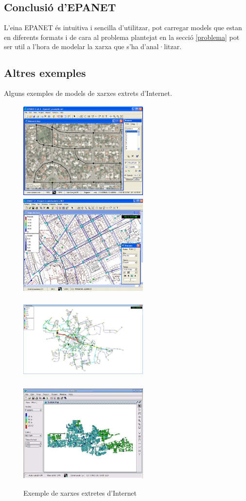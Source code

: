 \documentclass[12pt]{article}
\begin{document}
\clearpage
\subsection{Conclusió d'EPANET}
L'eina EPANET és intuitiva i sencilla d'utilitzar, pot carregar models que estan en diferents formats i de cara al problema plantejat en la secció \ref{problema} pot ser util a l'hora de modelar la xarxa que s'ha d'anal·litzar.

\subsection{Altres exemples}
Alguns exemples de models de xarxes extrets d'Internet.
\begin{figure}[h!]
	\centering
	\includegraphics[width=65mm, height=50mm]{imatges/epanet/exemples/x1.png}
	\hspace{.2cm}
	\includegraphics[width=65mm, height=50mm]{imatges/epanet/exemples/x2.jpg}
	\includegraphics[width=65mm, height=50mm]{imatges/epanet/exemples/x3.jpg}
	\hspace{.2cm}
	\includegraphics[width=65mm, height=50mm]{imatges/epanet/exemples/x4.jpg}
	\caption{Exemple de xarxes extretes d'Internet}
\end{figure}
\end{document}
